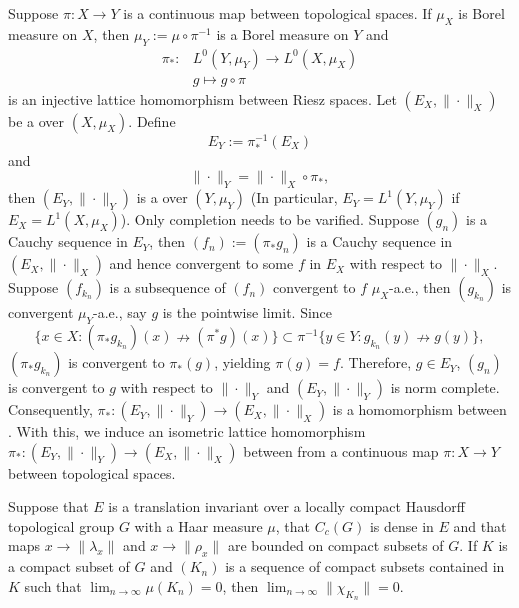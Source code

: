 
Suppose $\pi:X\to Y$ is a continuous map between topological spaces.
If $\mu_X$ is Borel measure on $X$, then $\mu_Y:=\mu\circ\pi^{-1}$ is a Borel measure on $Y$  and 
\begin{align*}
\pi_*: &L^0(Y,\mu_Y)\to L^0(X,\mu_X)\\
& g\mapsto g\circ\pi\end{align*}  
is an injective lattice homomorphism between Riesz spaces. 
Let $(E_X,\|\cdot\|_X)$ be a \bfs over $(X,\mu_X)$.  Define $$E_Y:=\pi_*^{-1}(E_X)$$ and $$\|\cdot\|_Y=\|\cdot\|_X\circ\pi_*,$$ then $(E_Y, \|\cdot\|_Y)$ is a \bfs over $(Y,\mu_Y)$ (In particular, $E_Y=L^1(Y,\mu_Y)$ if $E_X=L^1(X,\mu_X)$).
Only completion needs to be varified. Suppose $(g_n)$ is a Cauchy sequence in $E_Y$,  then $(f_n):=(\pi_*g_n)$ is a Cauchy sequence in $(E_X,\|\cdot\|_X)$ and hence convergent to some $f$ in $E_X$ with respect to $\|\cdot\|_X$. Suppose $(f_{k_n})$ is a subsequence of $(f_n)$ convergent to $f$ $\mu_X$-a.e., then $(g_{k_n})$ is convergent $\mu_Y$-a.e., say $g$ is the pointwise limit.  Since $$\{x\in X:(\pi_*g_{k_n})(x)\nrightarrow(\pi^* g)(x)\}\subset \pi^{-1}\{y\in  Y: g_{k_n}(y)\nrightarrow g(y)\},$$ $(\pi_*g_{k_n})$ is convergent to $\pi_*(g)$,  yielding $\pi(g)=f$. %
Therefore,  $g\in E_Y$, $(g_n)$ is convergent to $g$ with respect to $\|\cdot\|_Y$ and  $(E_Y, \|\cdot\|_Y)$ is norm complete.
Consequently, $\pi_*:(E_Y,\|\cdot\|_Y)\to (E_X,\|\cdot\|_X)$ is a homomorphism between \bfss.
With this,  %
we induce an isometric lattice homomorphism $\pi_*:(E_Y,\|\cdot\|_Y)\to (E_X,\|\cdot\|_X)$ between \bfss from a continuous map $\pi:X\to Y$ between topological spaces.


\begin{lemma}\label{lemma1}
	Suppose that $E$ is a translation invariant \bfs over a locally compact Hausdorff topological group $G$ with  a Haar measure  $\mu$, that $C_c(G)$ is dense in $E$ and that maps $x\to \|\lambda_x\|$ and $x\to \|\rho_x\|$  are bounded on compact subsets of $G$. If $K$ is a compact subset of $G$ and $(K_n)$ is a sequence of compact subsets contained in $K$ such that $\lim_{n\to\infty}\mu(K_n)=0$, then $\lim_{n\to\infty}\|\chi_{K_n}\|=0$.
\end{lemma}

